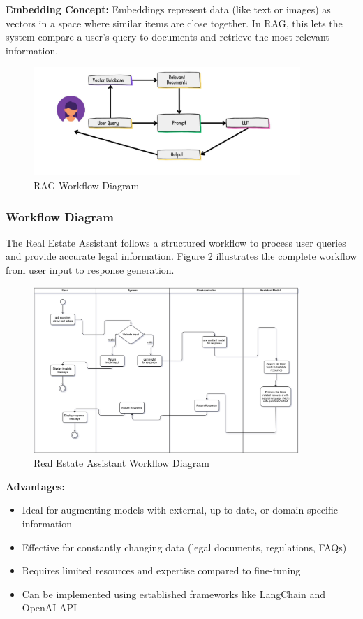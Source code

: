 \textbf{Embedding Concept:}
Embeddings represent data (like text or images) as vectors in a space where similar items are close together. In RAG, this lets the system compare a user's query to documents and retrieve the most relevant information.
\begin{figure}[htbp]
    \centering
    \includegraphics[width=0.9\textwidth]{images/rag_workflow_diagram.png}
    \caption{RAG Workflow Diagram}
    \label{fig:rag-workflow}
\end{figure}


\subsubsection{Workflow Diagram}
The Real Estate Assistant follows a structured workflow to process user queries and provide accurate legal information. Figure \ref{fig:assistant-workflow} illustrates the complete workflow from user input to response generation.
\newpage

\begin{figure}[htbp]
    \centering
    \includegraphics[width=0.9\textwidth]{images/assistant_workflow_diagram.png}
    \caption{Real Estate Assistant Workflow Diagram}
    \label{fig:assistant-workflow}
\end{figure}


\textbf{Advantages:}
\begin{itemize}
    \item Ideal for augmenting models with external, up-to-date, or domain-specific information
    \item Effective for constantly changing data (legal documents, regulations, FAQs)
    \item Requires limited resources and expertise compared to fine-tuning
    \item Can be implemented using established frameworks like LangChain and OpenAI API
\end{itemize}

